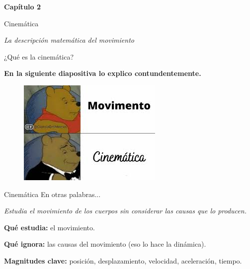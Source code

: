 \begin{frame}
\begin{center}
    \Huge \textbf{Capítulo 2}
    
    \LARGE Cinemática

    \textit{La descripción matemática del movimiento}
\end{center}
    
\end{frame}

\begin{frame}
    \begin{center}
        {\LARGE ¿Qué es la cinemática?}

        \vspace{2em}

        \textbf{En la siguiente diapositiva lo explico contundentemente.}
    \end{center}

    
\end{frame}

\begin{frame}
    \begin{figure}
    \centering
    \includegraphics[width=0.8\linewidth]{figures/meme2.jpeg}
\end{figure}
\end{frame}

\begin{frame}{Cinemática}
    En otras palabras...

    \vspace{1em}
    
    \begin{center}
        \textit{Estudia el movimiento de los cuerpos sin considerar las causas que lo producen.}
    \end{center}
    

    \vspace{1em}

    \textbf{Qué estudia:} el movimiento.

\textbf{Qué ignora:} las causas del movimiento (eso lo hace la dinámica).

\textbf{Magnitudes clave:} posición, desplazamiento, velocidad, aceleración, tiempo.
    
\end{frame}

